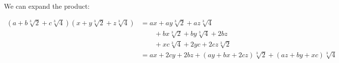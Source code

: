 \documentclass[12pt]{article}
\begin{document}
\begin{enumerate}
                    We can expand the product:
                    \begin{center}
                        \hspace*{-2in} \begin{minipage}{1.5\textwidth}
                            \begin{align*}
                                (a+ b\sqrt[3]{2}+c\sqrt[3]{4})(x+ y\sqrt[3]{2}+z\sqrt[3]{4}) &= ax + ay\sqrt[3]{2} + az\sqrt[3]{4}\\
                                &\qquad + bx\sqrt[3]{2} + by\sqrt[3]{4} + 2bz\\
                                &\qquad + xc\sqrt[3]{4} + 2yc + 2cz\sqrt[3]{2}\\
                                &= ax + 2cy + 2bz + (ay + bx + 2cz)\sqrt[3]{2} + (az + by + xc)\sqrt[3]{4}
                            \end{align*}
                        \end{minipage}
                    \end{center}
                    

\end{enumerate}
\end{document}
